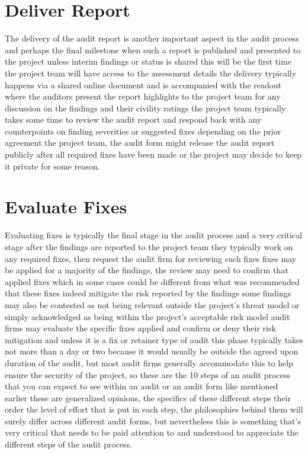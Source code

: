 \section{Deliver Report}

The delivery of the audit report is another important aspect in the audit process and perhaps the final milestone when such a report is published and presented to the project unless interim findings or status is shared this will be the first time the project team will have access to the assessment details the delivery typically happens via a shared online document and is accompanied with the readout where the auditors present the report highlights to the project team for any discussion on the findings and their civility ratings the project team typically takes some time to review the audit report and respond back with any counterpoints on finding severities or suggested fixes depending on the prior agreement the project team, the audit form might release the audit report publicly after all required fixes have been made or the project may decide to keep it private for some reason.

\section{Evaluate Fixes}

Evaluating fixes is typically the final stage in the audit process and a very critical stage after the findings are reported to the project team they typically work on any required fixes, then request the audit firm for reviewing such fixes fixes may be applied for a majority of the findings, the review may need to confirm that applied fixes which in some cases could be different from what was recommended that these fixes indeed mitigate the risk reported by the findings some findings may also be contested as not being relevant outside the project's threat model or simply acknowledged as being within the project's acceptable risk model audit firms may evaluate the specific fixes applied and confirm or deny their risk mitigation and unless it is a fix or retainer type of audit this phase typically takes not more than a day or two because it would usually be outside the agreed upon duration of the audit, but most audit firms generally accommodate this to help ensure the security of the project, so these are the 10 steps of an audit process that you can expect to see within an audit or an audit form like mentioned earlier these are generalized opinions, the specifics of these different steps their order the level of effort that is put in each step, the philosophies behind them will surely differ across different audit forms, but nevertheless this is something that's very critical that needs to be paid attention to and understood to appreciate the different steps of the audit process.

